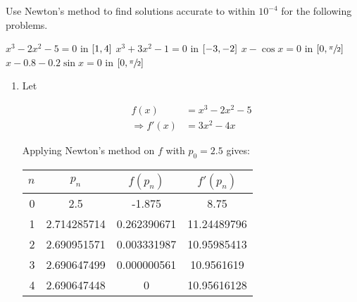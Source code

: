 \documentclass[../../../../Assignments]{subfiles}
\begin{document}
\begin{exercise}\label{exer:2.3.5}
    Use Newton's method to find solutions accurate to within \(10^{-4}\) for the
    following problems.

    \begin{tasks}
        \task \(x^3 - 2x^2 - 5 = 0\) in \(\interval{1}{4}\)
        \task \(x^3 + 3x^2 - 1 = 0\) in \(\interval{-3}{-2}\)
        \task \(x - \cos{x} = 0\) in \(\interval{0}{\sfrac{\pi}{2}}\)
        \task \(x - \num{0.8} - \num{0.2} \sin{x} = 0\) in \(\interval{0}{\sfrac{\pi}{2}}\)
    \end{tasks}
\end{exercise}

\begin{solution}
    \begin{enumerate}[label = \alph*)]
        \item Let

            \begin{align*}
                             f(x) &= x^3 - 2x^2 - 5 \\
                \Rightarrow f'(x) &= 3x^2 - 4x
            \end{align*}

            Applying Newton's method on \(f\) with \(p_0 = \num{2.5}\) gives:

            \begin{table}[H]
                \centering
                \begin{tabular}{r S[table-format=1.9] S[table-format=-1.9] S[table-format=2.9]}
                    \toprule
                    \(n\)  &   {\(p_n\)}   &  {\(f(p_n)\)}  &  {\(f'(p_n)\)}  \\
                      &  2.5          &  -1.875        &   8.75          \\
                        1  &  2.714285714  &   0.262390671  &  11.24489796    \\
                        2  &  2.690951571  &   0.003331987  &  10.95985413    \\
                        3  &  2.690647499  &   0.000000561  &  10.9561619     \\
                        4  &  2.690647448  &   0            &  10.95616128    \\
                    \bottomrule
                \end{tabular}
            \end{table}


\end{enumerate}
\end{solution}
\end{document}
